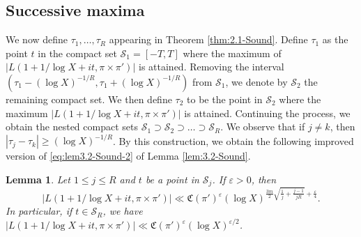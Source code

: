\documentclass[12pt,reqno]{amsart}
\newtheorem{lem}[thm]{Lemma}
\theoremstyle{remark}
\numberwithin{equation}{section}
\begin{document}
    
	\subsection{Successive maxima} 
	 
    We now define $\tau_1, \ldots, \tau_R$ appearing in Theorem \ref{thm:2.1-Sound}.
    Define $\tau_1$ as the point $t$ in the compact set $\mathcal{S}_1 = [-T, T]$ where the maximum of $|L(1+1/\log X +it, \pi \times \pi')|$ is attained. Removing the interval $(\tau_1 - (\log X)^{-1/R}, \tau_1 + (\log X)^{-1/R})$ from $\mathcal{S}_1$, we denote by $\mathcal{S}_2$ the remaining compact set. We then define $\tau_2$ to be the point in $\mathcal{S}_2$ where the maximum $|L(1+1/\log X +it, \pi \times \pi')|$ is attained. Continuing the process, we obtain the nested compact sets $\mathcal{S}_1 \supset \mathcal{S}_2 \supset \ldots \supset \mathcal{S}_R$. We observe that if $j \neq k$, then $|\tau_j - \tau_k| \ge (\log X)^{-1/R}$. By this construction, we obtain the following improved version of \eqref{eq:lem3.2-Sound-2} of Lemma \ref{lem:3.2-Sound}.
	\begin{lem}\label{lem:sound-5.1}
   Let  $1 \le j \le R$ and $t$ be a point in $\mathcal{S}_j$.  If $\varepsilon > 0$, then \begin{equation*}    |L(1+1/{\log X}+it, \pi \times \pi')| \ll \mathfrak{C}(\pi')^\varepsilon (\log X)^{\frac{3m}{2}\sqrt{\frac{1}{j}+\frac{j-1}{jR}}+\frac{\varepsilon}{4}}.
    \end{equation*}
		In particular, if $t \in \mathcal{S}_R$, we have $|L(1+1/\log X+it, \pi \times \pi')| \ll \mathfrak{C}(\pi')^{\varepsilon}(\log X)^{\varepsilon/2}$.
	\end{lem}
\end{document}

